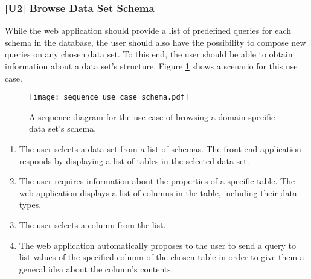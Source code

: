 \subsubsection{[U2] Browse Data Set Schema}
While the web application should provide a list of predefined queries for each schema in the database, the user should also have the possibility to compose new queries on any chosen data set. To this end, the user should be able to obtain information about a data set's structure. Figure \ref{fig:use_case_schema} shows a scenario for this use case.
\begin{figure}
	\centering\texttt{[image: sequence\_use\_case\_schema.pdf]}
	\caption{A sequence diagram for the use case of browsing a domain-specific data set's schema.}
	\label{fig:use_case_schema}
\end{figure}
\begin{enumerate}
	\item The user selects a data set from a list of schemas. The front-end application responds by displaying a list of tables in the selected data set.
	\item The user requires information about the properties of a specific table. The web application displays a list of columns in the table, including their data types.
	\item The user selects a column from the list.
	\item The web application automatically proposes to the user to send a query to list values of the specified column of the chosen table in order to give them a general idea about the column's contents.
\end{enumerate}

